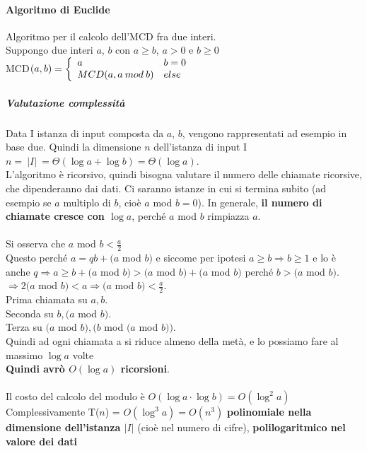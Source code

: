 \documentclass[10pt]{book}
\begin{document}
\paragraph{Algoritmo di Euclide} Algoritmo per il calcolo dell'MCD fra due interi.\\
Suppongo due interi $a$, $b$ con $a \geq b$, $a > 0$ e  $b \geq 0$\\
MCD$(a,b) = \left\{ \begin{array}{l l}
a & b = 0\\
MCD(a, a\: mod\: b) & else
\end{array}\right.$
\subparagraph{Valutazione complessità} Data I istanza di input composta da $a$, $b$, vengono rappresentati ad esempio in base due. Quindi la dimensione $n$ dell'istanza di input I $n = \:|I|\:=\Theta(\log a + \log b) = \Theta(\log a)$.\\
L'algoritmo è ricorsivo, quindi bisogna valutare il numero delle chiamate ricorsive, che dipenderanno dai dati. Ci saranno istanze in cui si termina subito (ad esempio se $a$ multiplo di $b$, cioè $a$ mod $b = 0$). In generale, \textbf{il numero di chiamate cresce con $\log a$}, perché $a$ mod $b$ rimpiazza $a$.\\\\
Si osserva che $a$ mod $b < \frac{a}{2}$\\
Questo perché $a = qb + (a$ mod $b)$ e siccome per ipotesi $a \geq b \Rightarrow b \geq 1$ e lo è anche $q \Rightarrow a \geq b + (a$ mod $b) > (a$ mod $b) + (a$ mod $b)$ perché $b > (a$ mod $b)$.\\ $\Rightarrow 2(a$ mod $b) < a \Rightarrow (a$ mod $b) < \frac{a}{2}$.\\
Prima chiamata su $a, b$.\\
Seconda su $b, (a$ mod $b)$.\\
Terza su $(a$ mod $b), (b$ mod $(a$ mod $b))$.\\
Quindi ad ogni chiamata a si riduce almeno della metà, e lo possiamo fare al massimo $\log a$ volte\\
\textbf{Quindi avrò $O(\log a)$ ricorsioni}.\\\\
Il costo del calcolo del modulo è $O(\log a \cdot \log b) = O(\log^2 a)$\\
Complessivamente T($n$) = $O(\log^3 a) = O(n^3)$ \textbf{polinomiale nella dimensione dell'istanza $|I|$} (cioè nel numero di cifre), \textbf{polilogaritmico nel valore dei dati}
\end{document}
